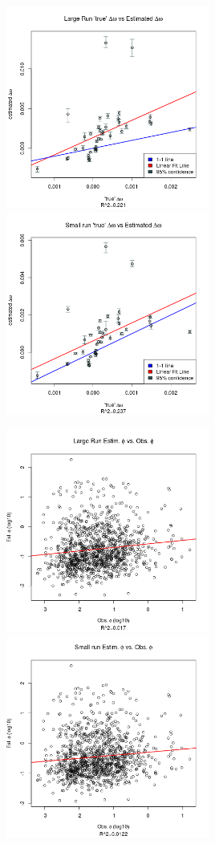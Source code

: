 \includegraphics[width=0.5\textwidth]{data/omega_largerun.png}
\includegraphics[width=0.5\textwidth]{data/omega_smallrun.png}

\includegraphics[width=0.5\textwidth]{data/phi_largerun.png}
\includegraphics[width=0.5\textwidth]{data/phi_smallrun.png}

